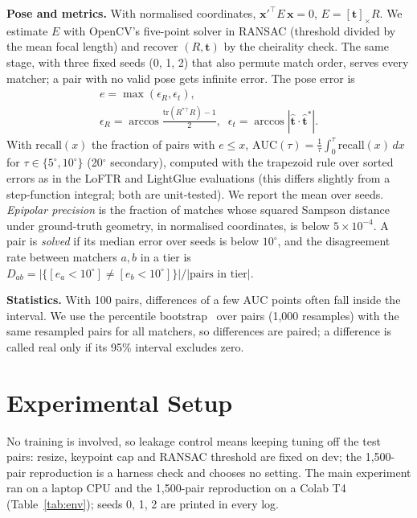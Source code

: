 \documentclass[10pt,twocolumn,letterpaper]{article}
\newcommand{\dg}{^{\circ}}
\begin{document}
\noindent\textbf{Pose and metrics.} With normalised coordinates, $\mathbf{x}'^{\top}E\,\mathbf{x}=0$, $E=[\mathbf t]_\times R$. We estimate $E$ with OpenCV's five-point solver in RANSAC (threshold divided by the mean focal length) and recover $(R,\mathbf t)$ by the cheirality check. The same stage, with three fixed seeds (0, 1, 2) that also permute match order, serves every matcher; a pair with no valid pose gets infinite error. The pose error is
\begin{equation}
\begin{gathered}e=\max(\epsilon_R,\epsilon_t),\\ \epsilon_R=\arccos\tfrac{\mathrm{tr}(R^{*\top}R)-1}{2},\;\; \epsilon_t=\arccos|\hat{\mathbf t}\!\cdot\!\hat{\mathbf t}^{*}|.\end{gathered}
\end{equation}
With $\mathrm{recall}(x)$ the fraction of pairs with $e\le x$, $\mathrm{AUC}(\tau)=\tfrac1\tau\int_0^\tau \mathrm{recall}(x)\,dx$ for $\tau\in\{5\dg,10\dg\}$ (20$\dg$ secondary), computed with the trapezoid rule over sorted errors as in the LoFTR and LightGlue evaluations (this differs slightly from a step-function integral; both are unit-tested). We report the mean over seeds. \emph{Epipolar precision} is the fraction of matches whose squared Sampson distance~\cite{hz} under ground-truth geometry, in normalised coordinates, is below $5\times10^{-4}$. A pair is \emph{solved} if its median error over seeds is below $10\dg$, and the disagreement rate between matchers $a,b$ in a tier is $D_{ab}=|\{[e_a{<}10\dg]\neq[e_b{<}10\dg]\}|/|\text{pairs in tier}|$.

\noindent\textbf{Statistics.} With 100 pairs, differences of a few AUC points often fall inside the interval. We use the percentile bootstrap~\cite{efron} over pairs (1,000 resamples) with the same resampled pairs for all matchers, so differences are paired; a difference is called real only if its 95\% interval excludes zero.

\section{Experimental Setup}
No training is involved, so leakage control means keeping tuning off the test pairs: resize, keypoint cap and RANSAC threshold are fixed on dev; the 1,500-pair reproduction is a harness check and chooses no setting. The main experiment ran on a laptop CPU and the 1,500-pair reproduction on a Colab T4 (Table~\ref{tab:env}); seeds 0, 1, 2 are printed in every log.
\end{document}
